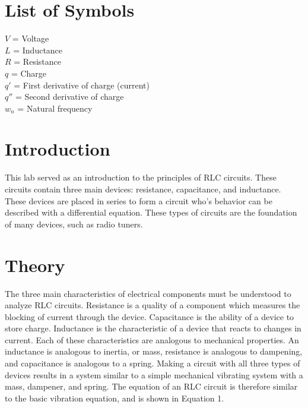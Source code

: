 \documentclass[12pt]{article}
\begin{document}

\tableofcontents

\listoffigures

\bigskip


\section*{\fontsize{12}{12}\selectfont \large List of Symbols}
$V$ = Voltage\\
$L$ = Inductance\\
$R$ = Resistance\\
$q$ = Charge\\
$q'$ = First derivative of charge (current)\\
$q''$ = Second derivative of charge\\
$w_{n}$ = Natural frequency\\

\newpage


\section*{\fontsize{12}{12}\selectfont \large Introduction}
This lab served as an introduction to the principles of RLC circuits. These circuits contain three main devices: resistance, capacitance, and inductance. These devices are placed in series to form a circuit who's behavior can be described with a differential equation. These types of circuits are the foundation of many devices, such as radio tuners. 


\section*{\fontsize{12}{12}\selectfont \large Theory}
The three main characteristics of electrical components must be understood to analyze RLC circuits. Resistance is a quality of a component which measures the blocking of current through the device. Capacitance is the ability of a device to store charge. Inductance is the characteristic of a device that reacts to changes in current. Each of these characteristics are analogous to mechanical properties. An inductance is analogous to inertia, or mass, resistance is analogous to dampening, and capacitance is analogous to a spring. Making a circuit with all three types of devices results in a system similar to a simple mechanical vibrating system with a mass, dampener, and spring. The equation of an RLC circuit is therefore similar to the basic vibration equation, and is shown in Equation 1.
\bigskip
\end{document}

